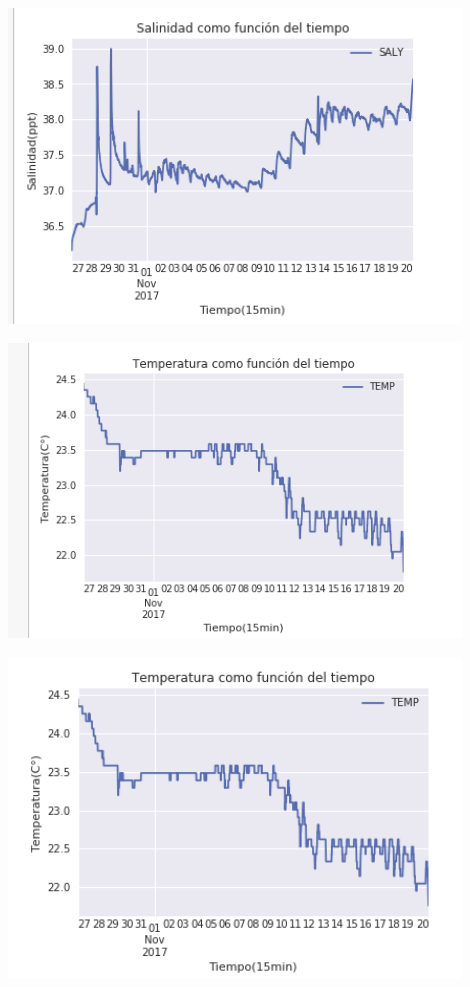 \documentclass{article}
\begin{document}
\begin{center}
	\includegraphics[width=12cm]{SALYtime.png}
    
\end{center}
\vspace{0.3cm}

\begin{center}
	\includegraphics[width=12cm]{TEMPNtime.png}
      
\end{center}
\vspace{0.2cm}

\begin{center}
	\includegraphics[width=12cm]{TEMPStime.png}
        
\end{center}
\vspace{0.2cm}
\end{document}

